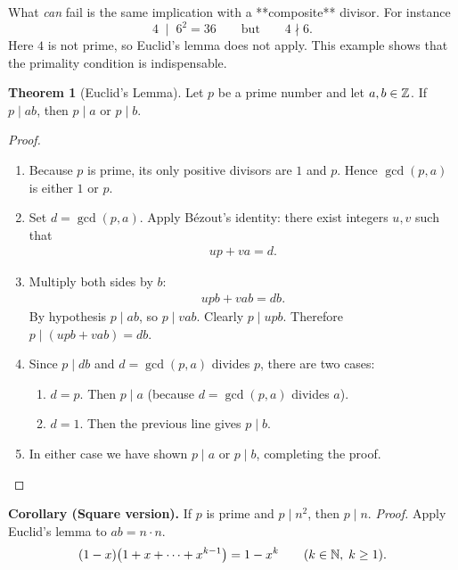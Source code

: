 \documentclass[12pt]{article}
\theoremstyle{definition} %
\newtheorem{theorem}{Theorem}
\theoremstyle{plain} %
\begin{document}
\medskip
What \emph{can} fail is the same implication with a **composite** divisor.
For instance
\[
4 \;\mid\; 6^{2}=36
\qquad\text{but}\qquad
4 \nmid 6.
\]
Here \(4\) is not prime, so Euclid’s lemma does not apply.  
This example shows that the primality condition is indispensable.
\begin{theorem}[Euclid’s Lemma]
  Let $p$ be a prime number and let $a,b\in\Bbb Z$.  
  If $p\mid ab$, then $p\mid a$ or $p\mid b$.
\end{theorem}

\begin{proof}
  \begin{enumerate}
      \item Because $p$ is prime, its only positive divisors are $1$ and $p$.  
            Hence $\gcd(p,a)$ is either $1$ or $p$.
      \item Set $d=\gcd(p,a)$.  Apply Bézout’s identity: there exist integers $u,v$
            such that
            \begin{align}
                up+va=d.
            \end{align}
      \item Multiply both sides by $b$:
            \begin{align}
                upb+vab=db.
            \end{align}
            By hypothesis $p\mid ab$, so $p\mid vab$.  Clearly $p\mid upb$.
            Therefore $p\mid (upb+vab)=db$.
      \item Since $p\mid db$ and $d=\gcd(p,a)$ divides $p$, there are two cases:
            \begin{enumerate}
                \item $d=p$.  Then $p\mid a$ (because $d=\gcd(p,a)$ divides $a$).
                \item $d=1$.  Then the previous line gives $p\mid b$.
            \end{enumerate}
      \item In either case we have shown $p\mid a$ or $p\mid b$, completing the proof.
  \end{enumerate}
\end{proof}

\bigskip
\textbf{Corollary (Square version).}
If $p$ is prime and $p\mid n^{2}$, then $p\mid n$.  
\emph{Proof.}  Apply Euclid’s lemma to $ab = n\cdot n$.
\[
(1-x)\bigl(1+x+\dots+x^{k-1}\bigr)=1-x^{k}\qquad(k\in\Bbb N,\;k\ge 1).
\]
\end{document}
